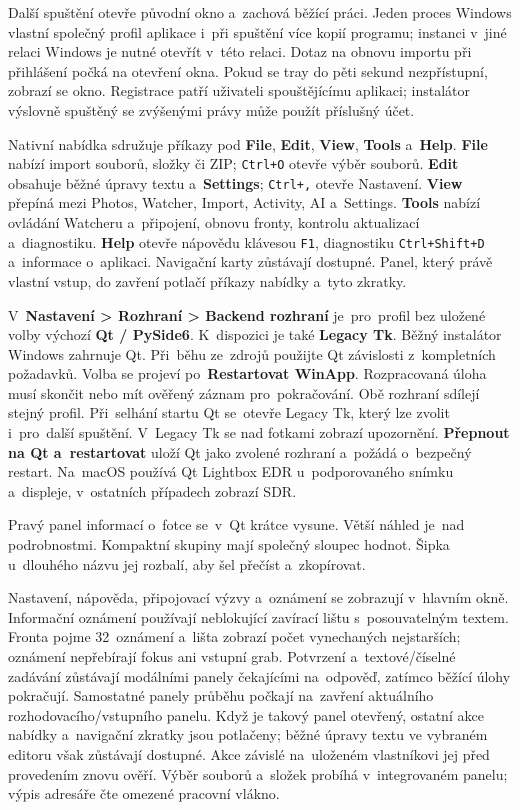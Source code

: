 \documentclass[11pt,a4paper]{article}
\newcommand{\ui}[1]{\textbf{#1}}
\begin{document}
Další spuštění otevře původní okno a~zachová běžící práci. Jeden proces Windows
vlastní společný profil aplikace i~při spuštění více kopií programu; instanci
v~jiné relaci Windows je nutné otevřít v~této relaci. Dotaz na obnovu importu
při přihlášení počká na otevření okna. Pokud se tray do pěti sekund
nezpřístupní,
zobrazí se okno. Registrace patří uživateli spouštějícímu aplikaci; instalátor
výslovně spuštěný se zvýšenými právy může použít příslušný účet.

Nativní nabídka sdružuje příkazy pod \ui{File}, \ui{Edit}, \ui{View},
\ui{Tools} a~\ui{Help}. \ui{File} nabízí import souborů, složky či ZIP;
\texttt{Ctrl+O} otevře výběr souborů. \ui{Edit} obsahuje běžné úpravy textu
a~\ui{Settings}; \texttt{Ctrl+,} otevře Nastavení. \ui{View} přepíná mezi
Photos, Watcher, Import, Activity, AI a~Settings. \ui{Tools} nabízí ovládání
Watcheru a~připojení, obnovu fronty, kontrolu aktualizací a~diagnostiku.
\ui{Help} otevře nápovědu klávesou \texttt{F1}, diagnostiku
\texttt{Ctrl+Shift+D} a~informace o~aplikaci. Navigační karty zůstávají
dostupné. Panel, který právě vlastní vstup, do zavření potlačí příkazy nabídky
a~tyto zkratky.

V~\ui{Nastavení > Rozhraní > Backend rozhraní} je~pro~profil bez uložené volby
výchozí \ui{Qt / PySide6}. K~dispozici je také \ui{Legacy Tk}.
Běžný instalátor Windows zahrnuje Qt. Při~běhu ze~zdrojů použijte Qt závislosti
z~kompletních požadavků.
Volba se projeví po~\ui{Restartovat WinApp}. Rozpracovaná úloha musí skončit
nebo mít ověřený záznam pro~pokračování. Obě rozhraní sdílejí stejný profil.
Při~selhání startu Qt se~otevře Legacy Tk, který lze zvolit i~pro~další spuštění.
V~Legacy Tk se nad fotkami zobrazí upozornění.
\ui{Přepnout na Qt a~restartovat} uloží Qt jako zvolené rozhraní a~požádá
o~bezpečný restart.
Na~macOS používá Qt Lightbox EDR u~podporovaného snímku a~displeje,
v~ostatních případech zobrazí SDR.

Pravý panel informací o~fotce se~v~Qt krátce vysune. Větší náhled je~nad
podrobnostmi. Kompaktní skupiny mají společný sloupec hodnot. Šipka u~dlouhého
názvu jej rozbalí, aby šel přečíst a~zkopírovat.

Nastavení, nápověda, připojovací výzvy a~oznámení se zobrazují v~hlavním okně.
Informační oznámení používají neblokující zavírací lištu s~posouvatelným textem.
Fronta pojme 32~oznámení a~lišta zobrazí počet vynechaných nejstarších; oznámení
nepřebírají fokus ani vstupní grab. Potvrzení a~textové/číselné zadávání zůstávají
modálními panely čekajícími na~odpověď, zatímco běžící úlohy pokračují.
Samostatné panely průběhu počkají na~zavření aktuálního rozhodovacího/vstupního
panelu. Když je takový panel otevřený, ostatní akce nabídky a~navigační zkratky
jsou potlačeny; běžné úpravy textu ve vybraném editoru však zůstávají dostupné.
Akce závislé na~uloženém vlastníkovi jej před provedením znovu ověří. Výběr
souborů a~složek probíhá v~integrovaném panelu; výpis adresáře čte omezené
pracovní vlákno.
\end{document}
